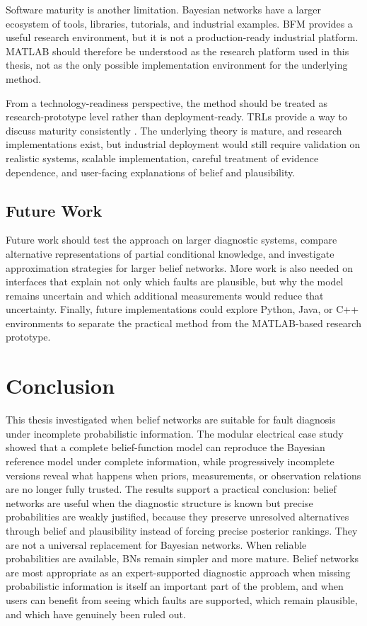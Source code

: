 \documentclass[runningheads]{llncs}
\begin{document}
Software maturity is another limitation. Bayesian networks have a larger ecosystem of tools, libraries, tutorials, and industrial examples. BFM provides a useful research environment, but it is not a production-ready industrial platform. MATLAB should therefore be understood as the research platform used in this thesis, not as the only possible implementation environment for the underlying method.

From a technology-readiness perspective, the method should be treated as research-prototype level rather than deployment-ready. TRLs provide a way to discuss maturity consistently \cite{Mankins1995}. The underlying theory is mature, and research implementations exist, but industrial deployment would still require validation on realistic systems, scalable implementation, careful treatment of evidence dependence, and user-facing explanations of belief and plausibility.

\subsection{Future Work}
\label{sec:future_work}

Future work should test the approach on larger diagnostic systems, compare alternative representations of partial conditional knowledge, and investigate approximation strategies for larger belief networks. More work is also needed on interfaces that explain not only which faults are plausible, but why the model remains uncertain and which additional measurements would reduce that uncertainty. Finally, future implementations could explore Python, Java, or C++ environments to separate the practical method from the MATLAB-based research prototype.


\section{Conclusion}
\label{sec:conclusion}

This thesis investigated when belief networks are suitable for fault diagnosis under incomplete probabilistic information. The modular electrical case study showed that a complete belief-function model can reproduce the Bayesian reference model under complete information, while progressively incomplete versions reveal what happens when priors, measurements, or observation relations are no longer fully trusted. The results support a practical conclusion: belief networks are useful when the diagnostic structure is known but precise probabilities are weakly justified, because they preserve unresolved alternatives through belief and plausibility instead of forcing precise posterior rankings. They are not a universal replacement for Bayesian networks. When reliable probabilities are available, BNs remain simpler and more mature. Belief networks are most appropriate as an expert-supported diagnostic approach when missing probabilistic information is itself an important part of the problem, and when users can benefit from seeing which faults are supported, which remain plausible, and which have genuinely been ruled out.
\end{document}
